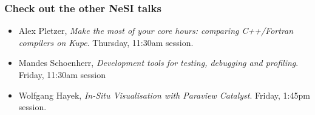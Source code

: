 \documentclass[aspectratio=169]{beamer}
\begin{document}
\begin{frame}
    \frametitle{Check out the other NeSI talks}
    
    \begin{itemize}
        \item Alex Pletzer, \textit{Make the most of your core hours: comparing C++/Fortran compilers on Kupe}. Thursday, 11:30am session.
        \item Mandes Schoenherr, \textit{Development tools for testing, debugging and profiling}. Friday, 11:30am session
        \item Wolfgang Hayek, \textit{In-Situ Visualisation with Paraview Catalyst}. Friday, 1:45pm session.
    \end{itemize}
    
    \vspace{1cm}
    
    
\end{frame}
\end{document}
